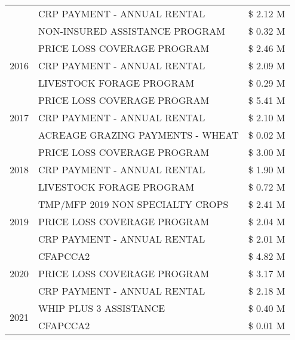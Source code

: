 \begin{tabular}{llr}
 & CRP PAYMENT - ANNUAL RENTAL & \$ 2.12 M \\
 & NON-INSURED ASSISTANCE PROGRAM & \$ 0.32 M \\
\cline{1-3}
\multirow[t]{3}{*}{2016} & PRICE LOSS COVERAGE PROGRAM & \$ 2.46 M \\
 & CRP PAYMENT - ANNUAL RENTAL & \$ 2.09 M \\
 & LIVESTOCK FORAGE PROGRAM & \$ 0.29 M \\
\cline{1-3}
\multirow[t]{3}{*}{2017} & PRICE LOSS COVERAGE PROGRAM & \$ 5.41 M \\
 & CRP PAYMENT - ANNUAL RENTAL & \$ 2.10 M \\
 & ACREAGE GRAZING PAYMENTS - WHEAT & \$ 0.02 M \\
\cline{1-3}
\multirow[t]{3}{*}{2018} & PRICE LOSS COVERAGE PROGRAM & \$ 3.00 M \\
 & CRP PAYMENT - ANNUAL RENTAL & \$ 1.90 M \\
 & LIVESTOCK FORAGE PROGRAM & \$ 0.72 M \\
\cline{1-3}
\multirow[t]{3}{*}{2019} & TMP/MFP 2019 NON SPECIALTY CROPS & \$ 2.41 M \\
 & PRICE LOSS COVERAGE PROGRAM & \$ 2.04 M \\
 & CRP PAYMENT - ANNUAL RENTAL & \$ 2.01 M \\
\cline{1-3}
\multirow[t]{3}{*}{2020} & CFAPCCA2 & \$ 4.82 M \\
 & PRICE LOSS COVERAGE PROGRAM & \$ 3.17 M \\
 & CRP PAYMENT - ANNUAL RENTAL & \$ 2.18 M \\
\cline{1-3}
\multirow[t]{2}{*}{2021} & WHIP PLUS 3 ASSISTANCE & \$ 0.40 M \\
 & CFAPCCA2 & \$ 0.01 M \\
\cline{1-3}
\bottomrule
\end{tabular}
